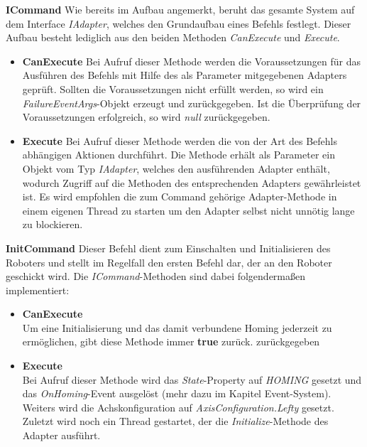 \textbf{ICommand}
\newline
Wie bereits im Aufbau angemerkt, beruht das gesamte System auf dem Interface \textit{IAdapter}, welches den Grundaufbau eines Befehls festlegt. Dieser Aufbau besteht lediglich aus den beiden Methoden \textit{CanExecute} und \textit{Execute}.
\begin{itemize}
\item \textbf{CanExecute}
\newline
Bei Aufruf dieser Methode werden die Voraussetzungen für das Ausführen des Befehls mit Hilfe des als Parameter mitgegebenen Adapters geprüft. Sollten die Voraussetzungen nicht erfüllt werden, so wird ein \textit{FailureEventArgs}-Objekt erzeugt und zurückgegeben. Ist die Überprüfung der Voraussetzungen erfolgreich, so wird \textit{null} zurückgegeben.
\item \textbf{Execute}
\newline
Bei Aufruf dieser Methode werden die von der Art des Befehls abhängigen Aktionen durchführt. Die Methode erhält als Parameter ein Objekt vom Typ \textit{IAdapter}, welches den ausführenden Adapter enthält, wodurch Zugriff auf die Methoden des entsprechenden Adapters gewährleistet ist. Es wird empfohlen die zum Command gehörige Adapter-Methode in einem eigenen Thread zu starten um den Adapter selbst nicht unnötig lange zu blockieren.
\end{itemize}

\textbf{InitCommand}
\newline
Dieser Befehl dient zum Einschalten und Initialisieren des Roboters und stellt im Regelfall den ersten Befehl dar, der an den Roboter geschickt wird. Die \textit{ICommand}-Methoden sind dabei folgendermaßen implementiert:
\begin{itemize}
\item \textbf{CanExecute}\\
Um eine Initialisierung und das damit verbundene Homing jederzeit zu ermöglichen, gibt diese Methode immer \textbf{true} zurück.
zurückgegeben
\item \textbf{Execute}\\
Bei Aufruf dieser Methode wird das \textit{State}-Property auf \textit{HOMING} gesetzt und das \textit{OnHoming}-Event ausgelöst (mehr dazu im Kapitel Event-System). Weiters wird die Achskonfiguration auf \textit{AxisConfiguration.Lefty} gesetzt. Zuletzt wird noch ein Thread gestartet, der die \textit{Initialize}-Methode des Adapter ausführt.
\end{itemize}

